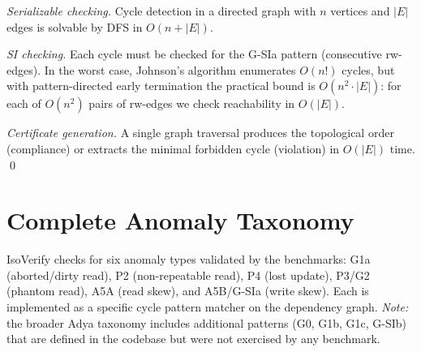 \documentclass[11pt]{article}
\begin{document}
\emph{Serializable checking.}  Cycle detection in a directed graph with $n$
vertices and $|E|$ edges is solvable by DFS in $O(n + |E|)$.

\emph{SI checking.}  Each cycle must be checked for the G-SIa pattern
(consecutive rw-edges).  In the worst case, Johnson's algorithm enumerates
$O(n!)$ cycles, but with pattern-directed early termination the practical
bound is $O(n^2 \cdot |E|)$: for each of $O(n^2)$ pairs of rw-edges we
check reachability in $O(|E|)$.

\emph{Certificate generation.}  A single graph traversal produces the
topological order (compliance) or extracts the minimal forbidden cycle
(violation) in $O(|E|)$ time.  \qed

\section{Complete Anomaly Taxonomy}
IsoVerify checks for six anomaly types validated by the benchmarks:
G1a (aborted/dirty read), P2 (non-repeatable read), P4 (lost update),
P3/G2 (phantom read), A5A (read skew), and A5B/G-SIa (write skew).
Each is implemented as a specific cycle pattern matcher on the dependency
graph.  \emph{Note:} the broader Adya taxonomy includes additional
patterns (G0, G1b, G1c, G-SIb) that are defined in the codebase but
were not exercised by any benchmark.
\end{document}
